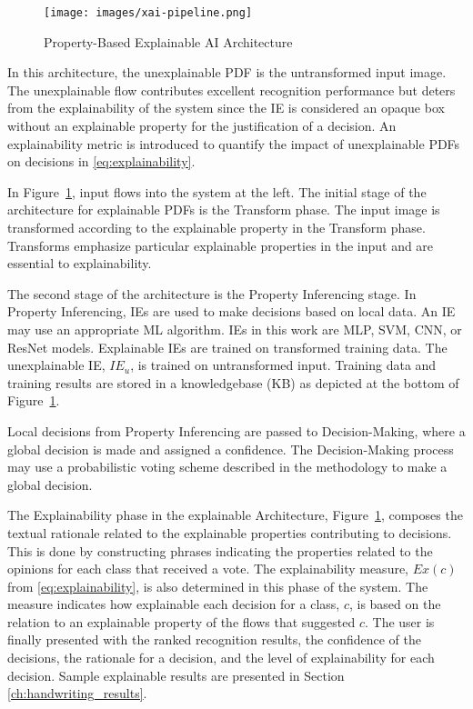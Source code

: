 \begin{figure}[t]
    \texttt{[image: images/xai-pipeline.png]}
    \caption{Property-Based Explainable AI Architecture}
    \label{fig:xai_arch}
\end{figure}

In this architecture, the unexplainable PDF is the untransformed input image.
The unexplainable flow contributes excellent recognition performance but deters
from the explainability of the system since the IE is considered an opaque box
without an explainable property for the justification of a decision. An
explainability metric is introduced to quantify the impact of unexplainable PDFs
on decisions in \eqref{eq:explainability}.

In Figure~\ref{fig:xai_arch}, input flows into the system at the left. The
initial stage of the architecture for explainable PDFs is the Transform phase.
The input image is transformed according to the explainable property in the
Transform phase. Transforms emphasize particular explainable properties in the
input and are essential to explainability.

The second stage of the architecture is the Property Inferencing stage. In
Property Inferencing, IEs are used to make decisions based on local data. An IE
may use an appropriate ML algorithm. IEs in this work are MLP, SVM, CNN, or
ResNet models. Explainable IEs are trained on transformed training data. The
unexplainable IE, $IE_u$, is trained on untransformed input. Training data and
training results are stored in a knowledgebase (KB) as depicted at the bottom of
Figure~\ref{fig:xai_arch}.

Local decisions from Property Inferencing are passed to Decision-Making, where a
global decision is made and assigned a confidence. The Decision-Making process
may use a probabilistic voting scheme described in the methodology to make a
global decision.

The Explainability phase in the explainable Architecture,
Figure~\ref{fig:xai_arch}, composes the textual rationale related to the
explainable properties contributing to decisions. This is done by constructing
phrases indicating the properties related to the opinions for each class that
received a vote. The explainability measure, $Ex(c)$ from
\eqref{eq:explainability}, is also determined in this phase of the system. The
measure indicates how explainable each decision for a class, $c$, is based on
the relation to an explainable property of the flows that suggested $c$. The
user is finally presented with the ranked recognition results, the confidence of
the decisions, the rationale for a decision, and the level of explainability for
each decision. Sample explainable results are presented in Section
\ref{ch:handwriting_results}.

